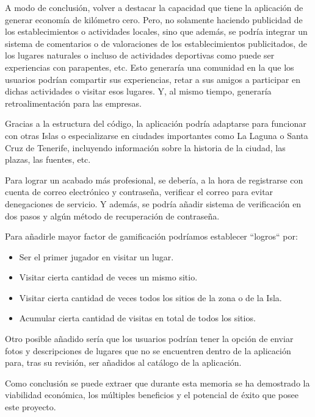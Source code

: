 A modo de conclusión, volver a destacar la capacidad que tiene la aplicación de generar economía de kilómetro cero. Pero, no solamente haciendo publicidad de los establecimientos o actividades locales, sino que además, se podría integrar un sistema de comentarios o de valoraciones de los establecimientos publicitados, de los lugares naturales o incluso de actividades deportivas como puede ser experiencias con parapentes, etc. Esto generaría una comunidad en la que los usuarios podrían compartir sus experiencias, retar a sus amigos a participar en dichas actividades o visitar esos lugares. Y, al mismo tiempo, generaría retroalimentación para las empresas.

Gracias a la estructura del código, la aplicación podría adaptarse para funcionar con otras Islas o especializarse en ciudades importantes como La Laguna o Santa Cruz de Tenerife, incluyendo información sobre la historia de la ciudad, las plazas, las fuentes, etc.

Para lograr un acabado más profesional, se debería, a la hora de registrarse con cuenta de correo electrónico y contraseña, verificar el correo para evitar denegaciones de servicio. Y además, se podría añadir sistema de verificación en dos pasos y algún método de recuperación de contraseña.

Para añadirle mayor factor de gamificación podríamos establecer ``logros`` por:
\begin{itemize}
\item Ser el primer jugador en visitar un lugar.
\item Visitar cierta cantidad de veces un mismo sitio.
\item Visitar cierta cantidad de veces todos los sitios de la zona o de la Isla.
\item Acumular cierta cantidad de visitas en total de todos los sitios.
\end{itemize}

Otro posible añadido sería que los usuarios podrían tener la opción de enviar fotos y descripciones de lugares que no se encuentren dentro de la aplicación para, tras su revisión, ser añadidos al catálogo de la aplicación.

Como conclusión se puede extraer que durante esta memoria se ha demostrado la viabilidad económica, los múltiples beneficios y el potencial de éxito que posee este proyecto.